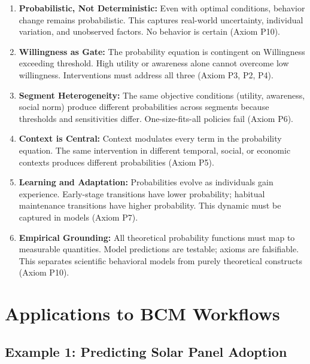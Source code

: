 \documentclass[11pt, a4paper]{article}
\begin{document}
\begin{enumerate}

\item \textbf{Probabilistic, Not Deterministic:} Even with optimal conditions, behavior change remains probabilistic. This captures real-world uncertainty, individual variation, and unobserved factors. No behavior is certain (Axiom P10).

\item \textbf{Willingness as Gate:} The probability equation is contingent on Willingness exceeding threshold. High utility or awareness alone cannot overcome low willingness. Interventions must address all three (Axiom P3, P2, P4).

\item \textbf{Segment Heterogeneity:} The same objective conditions (utility, awareness, social norm) produce different probabilities across segments because thresholds and sensitivities differ. One-size-fits-all policies fail (Axiom P6).

\item \textbf{Context is Central:} Context modulates every term in the probability equation. The same intervention in different temporal, social, or economic contexts produces different probabilities (Axiom P5).

\item \textbf{Learning and Adaptation:} Probabilities evolve as individuals gain experience. Early-stage transitions have lower probability; habitual maintenance transitions have higher probability. This dynamic must be captured in models (Axiom P7).

\item \textbf{Empirical Grounding:} All theoretical probability functions must map to measurable quantities. Model predictions are testable; axioms are falsifiable. This separates scientific behavioral models from purely theoretical constructs (Axiom P10).

\end{enumerate}


\section{Applications to BCM Workflows}

\subsection{Example 1: Predicting Solar Panel Adoption}
\end{document}
